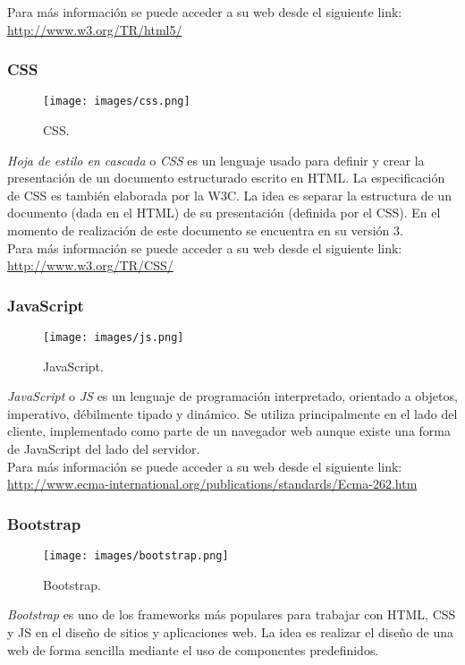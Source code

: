 Para más información se puede acceder a su web desde el siguiente link:\\ \url{http://www.w3.org/TR/html5/}

\subsubsection*{CSS}
\begin{figure}[H]
	\centering
	\texttt{[image: images/css.png]}
	\caption{CSS.}
\end{figure}
\textit{Hoja de estilo en cascada} o \textit{CSS} es un lenguaje usado para definir y crear la presentación de un documento estructurado escrito en HTML. La especificación de CSS es también elaborada por la W3C. La idea es separar la estructura de un documento (dada en el HTML) de su presentación (definida por el CSS). En el momento de realización de este documento se encuentra en su versión 3.\\  

Para más información se puede acceder a su web desde el siguiente link:\\ \url{http://www.w3.org/TR/CSS/}

\subsubsection*{JavaScript}
\begin{figure}[H]
	\centering
	\texttt{[image: images/js.png]}
	\caption{JavaScript.}
\end{figure}
\textit{JavaScript} o \textit{JS} es un lenguaje de programación interpretado, orientado a objetos, imperativo, débilmente tipado y dinámico. Se utiliza principalmente en el lado del cliente, implementado como parte de un navegador web aunque existe una forma de JavaScript del lado del servidor.\\  

Para más información se puede acceder a su web desde el siguiente link:\\ \url{http://www.ecma-international.org/publications/standards/Ecma-262.htm}

\subsubsection*{Bootstrap}
\begin{figure}[H]
	\centering
	\texttt{[image: images/bootstrap.png]}
	\caption{Bootstrap.}
\end{figure}
\textit{Bootstrap} es uno de los frameworks más populares para trabajar con HTML, CSS y JS en el diseño de sitios y aplicaciones web. La idea es realizar el diseño de una web de forma sencilla mediante el uso de componentes predefinidos.\\

